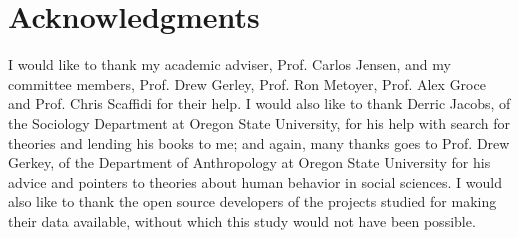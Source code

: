 \documentclass[12pt]{report}
\begin{document}
\section*{Acknowledgments}
\label{acknowledgments}
I would like to thank my academic adviser, Prof. Carlos Jensen, and my committee members, Prof. Drew Gerley, Prof. Ron Metoyer, Prof. Alex Groce and Prof. Chris Scaffidi for their help. I would also like to thank Derric Jacobs, of the Sociology Department at Oregon State University, for his help with search for theories and lending his books to me; and again, many thanks goes to Prof. Drew Gerkey, of the Department of Anthropology at Oregon State University for his advice and pointers to theories about human behavior in social sciences. I would also like to thank the open source developers of the projects studied for making their data available, without which this study would not have been possible. \\


%

\pagebreak
\end{document}
